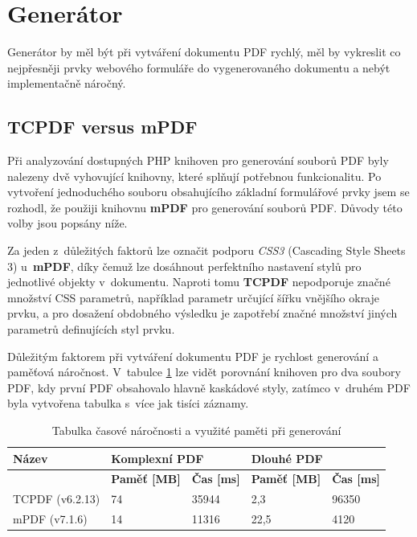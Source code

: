 \section{Generátor}
Generátor by měl být při vytváření dokumentu PDF rychlý, měl by vykreslit co nejpřesněji prvky webového formuláře do vygenerovaného dokumentu a nebýt implementačně náročný.
\subsection{TCPDF versus mPDF}
Při analyzování dostupných PHP knihoven pro generování souborů PDF byly nalezeny dvě vyhovující knihovny, které splňují potřebnou funkcionalitu. Po vytvoření jednoduchého souboru obsahujícího základní formulářové prvky jsem se rozhodl, že použiji knihovnu \textbf{mPDF} pro generování souborů PDF. Důvody této volby jsou popsány níže.
\par
Za jeden z~důležitých faktorů lze označit podporu \textit{CSS3} (Cascading Style Sheets 3) u~\textbf{mPDF}, díky čemuž lze dosáhnout perfektního nastavení stylů pro jednotlivé objekty v~dokumentu. Naproti tomu \textbf{TCPDF} nepodporuje značné množství CSS parametrů, například parametr určující šířku vnějšího okraje prvku, a pro dosažení obdobného výsledku je zapotřebí značné množství jiných parametrů definujících styl prvku.
\par
Důležitým faktorem při vytváření dokumentu PDF je rychlost generování a paměťová náročnost. V~tabulce \ref{tab:table_generators} lze vidět porovnání knihoven pro dva  soubory PDF, kdy první PDF obsahovalo hlavně kaskádové styly, zatímco v~druhém PDF byla vytvořena tabulka s~více jak tisíci záznamy.
\begin{table}[h!]
\centering
\begin{tabular}{|l|l|l|l|l|} 
\hline
\textbf{Název} & \multicolumn{2}{l|}{\textbf{Komplexní PDF}} & \multicolumn{2}{l|}{\textbf{Dlouhé PDF}}  \\ 
\hline
               & \textbf{Paměť [MB]} & \textbf{Čas [ms]}     & \textbf{Paměť [MB]} & \textbf{Čas [ms]}   \\ 
\hline
TCPDF (v6.2.13)          & 74                  & 35944                 & 2,3                 & 96350               \\ 
\hline
mPDF   (v7.1.6)           & 14                  & 11316                 & 22,5                & 4120                \\
\hline
\end{tabular}
\caption{Tabulka časové náročnosti a využité paměti při generování}
\label{tab:table_generators}
\end{table}
